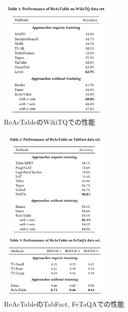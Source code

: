 \documentclass[dvipdfmx,uplatex]{jsarticle}
\theoremstyle{remark}
\begin{document}
\begin{figure}
    \centering
    \includegraphics[width=0.5\textwidth]{img/ReAcTable/wikitq_result.png}
    \caption{ReAcTableのWikiTQでの性能}
    \label{fig:wikitq_result}
\end{figure}

\begin{figure}
    \centering
    \includegraphics[width=0.5\textwidth]{img/ReAcTable/tabfact_fetaqa_result.png}
    \caption{ReAcTableのTabFact, FeTaQAでの性能}
    \label{fig:tabfact_fetaqa_result}
\end{figure}
\end{document}
